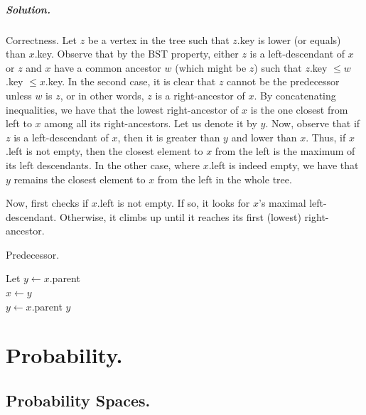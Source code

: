   \paragraph{Solution.} Correctness. Let $z$ be a vertex in the tree such that $z$.key is lower (or equals) than $x$.key. Observe that by the BST property, either $z$ is a left-descendant of $x$ or $z$ and $x$ have a common ancestor $w$ (which might be $z$) such that $z$.key $\le w$.key $\le x$.key. In the second case, it is clear that $z$ cannot be the predecessor unless $w$ is $z$, or in other words, $z$ is a right-ancestor of $x$. By concatenating inequalities, we have that the lowest right-ancestor of $x$ is the one closest from left to $x$ among all its right-ancestors. Let us denote it by $y$. Now, observe that if $z$ is a left-descendant of $x$, then it is greater than $y$ and lower than $x$. Thus, if $x$.left is not empty, then the closest element to $x$ from the left is the maximum of its left descendants. In the other case, where $x$.left is indeed empty, we have that $y$ remains the closest element to $x$ from the left in the whole tree.

 
  Now,  first checks if $x$.left is not empty. If so, it looks for $x$'s maximal left-descendant. Otherwise, it climbs up until it reaches its first (lowest) right-ancestor.

  
  \begin{algorithm}
\caption{Predecessor.} \label{alg:bst}
Let $y \leftarrow x$.parent \\
 {
    $x \leftarrow y$\\
    $y \leftarrow x$.parent
}
\Return $y$ 
\end{algorithm}
\fi
\ifdefined\Book
\fi



\newcommand{\image}{\text{ Im } }



\ifdefined\BOOK
\else
\setcounter{chapter}{6}
\fi
\chapter{Probability.} 

\section{ Probability Spaces. }

